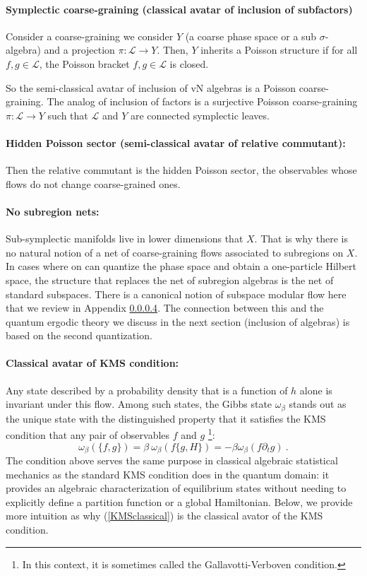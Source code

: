 \documentclass[a4paper,11pt]{article}
\theoremstyle{definition}
\newcommand{\mL}{\mathcal{L}}
\begin{document}
\paragraph{Symplectic coarse-graining (classical avatar of inclusion of subfactors)} Consider a coarse-graining we consider $Y$ (a coarse phase space or a sub $\sigma$-algebra) and a projection $\pi:\mL\to Y$. Then, $Y$ inherits a Poisson structure if for all $f,g\in \mL$, the Poisson bracket ${f,g}\in\mL$ is closed. 

So the semi-classical avatar of inclusion of vN algebras is a Poisson coarse-graining. The analog of inclusion of factors is a surjective Poisson coarse-graining $\pi:\mL\to Y$ such that $\mL$ and $Y$ are connected symplectic leaves. 

\paragraph{Hidden Poisson sector (semi-classical avatar of relative commutant):} Then the relative commutant is the hidden Poisson sector, the observables whose flows do not change coarse-grained ones.

\paragraph{No subregion nets:} Sub-symplectic manifolds live in lower dimensions that $X$. That is why there is no natural notion of a net of coarse-graining flows associated to subregions on $X$. In cases where on can quantize the phase space and obtain a one-particle Hilbert space, the structure that replaces the net of subregion algebras is the net of standard subspaces. There is a canonical notion of subspace modular flow here that we review in Appendix \ref{}. The connection between this and the quantum ergodic theory we discuss in the next section (inclusion of algebras) is based on the second quantization.

\paragraph{Classical avatar of KMS condition:}

Any state described by a probability density that is a function of $h$ alone is invariant under this flow. Among such states, the Gibbs state $\omega_\beta$ stands out as the unique state with the distinguished property that it satisfies the KMS condition that any pair of observables $f$ and $g$ \footnote{In this context, it is sometimes called the Gallavotti-Verboven condition.}:
\begin{equation}\label{KMSclassical}
    \omega_\beta(\{f, g\}) = \beta\: \omega_\beta(f \{g, H\})=-\beta \omega_\beta(f \partial_t g)\ .
\end{equation}
The condition above serves the same purpose in classical algebraic statistical mechanics as the standard KMS condition does in the quantum domain: it provides an algebraic characterization of equilibrium states without needing to explicitly define a partition function or a global Hamiltonian. Below, we provide more intuition as why (\ref{KMSclassical}) is the classical avator of the KMS condition.
\end{document}
